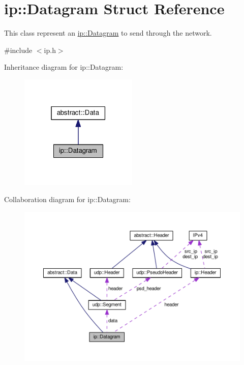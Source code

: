 \hypertarget{structip_1_1Datagram}{}\section{ip\+:\+:Datagram Struct Reference}
\label{structip_1_1Datagram}


This class represent an \hyperlink{structip_1_1Datagram}{ip\+::\+Datagram} to send through the network.  




{\ttfamily \#include $<$ip.\+h$>$}



Inheritance diagram for ip\+:\+:Datagram\+:\nopagebreak
\begin{figure}[H]
\begin{center}
\leavevmode
\includegraphics[width=159pt]{structip_1_1Datagram__inherit__graph}
\end{center}
\end{figure}


Collaboration diagram for ip\+:\+:Datagram\+:
\nopagebreak
\begin{figure}[H]
\begin{center}
\leavevmode
\includegraphics[width=350pt]{structip_1_1Datagram__coll__graph}
\end{center}
\end{figure}
